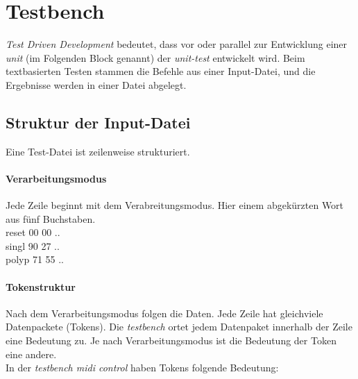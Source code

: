 
\chapter{Testbench}\label{chap.testen}
 \textit{Test Driven Development} bedeutet, dass vor oder parallel zur Entwicklung einer \textit{unit} (im Folgenden Block genannt) der \textit{unit-test} entwickelt wird\cite{Testdriven}. Beim textbasierten Testen stammen die Befehle aus einer Input-Datei, und die Ergebnisse werden in einer Datei abgelegt. 
 
 
\section{Struktur der Input-Datei}\label{sec.testbench_inputdatei} 

Eine Test-Datei ist zeilenweise strukturiert.

\subsubsection{Verarbeitungsmodus} 
Jede Zeile beginnt mit dem Verabreitungsmodus. Hier einem abgekürzten Wort aus fünf Buchstaben.\\

reset	\hspace{2mm} 00 \hspace*{2mm} 	00 \hspace*{2mm} 	..\\
singl	\hspace{2mm} 90 \hspace*{2mm} 	27 \hspace*{2mm} 	..\\
polyp	\hspace{1mm} 71 \hspace*{2mm} 	55 \hspace*{2mm} 	.. 


\subsubsection{Tokenstruktur} 
Nach dem Verarbeitungsmodus folgen die Daten. Jede Zeile hat gleichviele Datenpackete (Tokens). 
Die \textit{testbench} ortet jedem Datenpaket innerhalb der Zeile eine Bedeutung zu. Je nach Verarbeitungsmodus ist die Bedeutung der Token eine andere.\\ 
In der \textit{testbench midi control} haben Tokens folgende Bedeutung:


